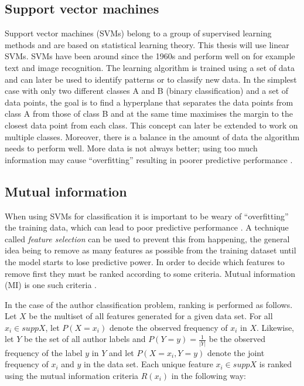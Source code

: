 \documentclass[a4paper,11pt]{kth-mag}
\begin{document}
\subsection{Support vector machines}
\label{sec:svms}
Support vector machines (SVMs) belong to a group of supervised learning methods
and are based on statistical learning theory. This thesis will use linear SVMs.
SVMs have been around since the 1960s and perform well on for example text and image recognition.
The learning algorithm is trained using a set of data and can later be used to identify patterns or to classify new data.
In the simplest case with only two different classes A and B (binary classification) and a set of data points,
the goal is to find a hyperplane that separates the data points from class A from those of class B and at
the same time maximises the margin to the closest data point from each class.
This concept can later be extended to work on multiple classes.
Moreover, there is a balance in the amount of data the algorithm needs to perform well.
More data is not always better; using too much information may cause ``overfitting''
resulting in poorer predictive performance \parencite{cristianini2000introduction}.

\subsection{Mutual information}
\label{sec:mi}
When using SVMs for classification it is important to be weary of
``overfitting'' the training data, which can lead to poor predictive
performance \parencite{cristianini2000introduction}. A technique called
\emph{feature selection} can be used to prevent this from happening, the
general idea being to remove as many features as possible from the training
dataset until the model starts to lose predictive power. In order to decide
which features to remove first they must be ranked according to some criteria.
Mutual information (MI) is one such criteria \parencite{guyon2003introduction}.

In the case of the author classification problem, ranking is performed as
follows. Let $X$ be the multiset of all features generated for a given data
set. For all $x_i \in supp X$, let $P(X = x_i)$ denote the observed frequency
of $x_i$ in $X$. Likewise, let $Y$ be the set of all author labels and $P(Y =
y)= \frac{1}{|Y|}$ be the observed frequency of the label $y$ in $Y$ and let
$P(X=x_i,Y=y)$ denote the joint frequency of $x_i$ and $y$ in the data set.
Each unique feature $x_i \in supp X $ is ranked using the mutual information
criteria $R(x_i)$ \parencite{guyon2003introduction} in the following way:
\end{document}
